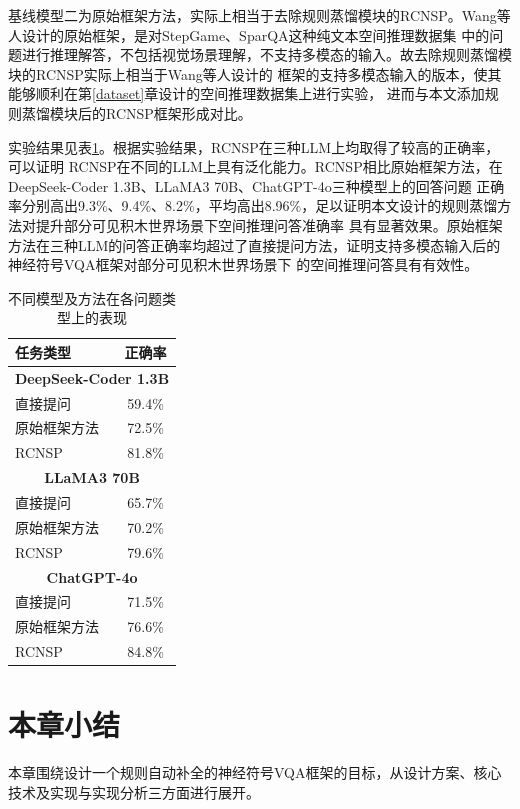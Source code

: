 基线模型二为原始框架方法，实际上相当于去除规则蒸馏模块的RCNSP。Wang等人设计的原始框架，是对StepGame、SparQA这种纯文本空间推理数据集
中的问题进行推理解答，不包括视觉场景理解，不支持多模态的输入。故去除规则蒸馏模块的RCNSP实际上相当于Wang等人设计的
框架的支持多模态输入的版本，使其能够顺利在第\ref{dataset}章设计的空间推理数据集上进行实验，
进而与本文添加规则蒸馏模块后的RCNSP框架形成对比。

实验结果见表\ref{tab:overall_comparison}。根据实验结果，RCNSP在三种LLM上均取得了较高的正确率，可以证明
RCNSP在不同的LLM上具有泛化能力。RCNSP相比原始框架方法，在DeepSeek-Coder 1.3B、LLaMA3 70B、ChatGPT-4o三种模型上的回答问题
正确率分别高出9.3\%、9.4\%、8.2\%，平均高出8.96\%，足以证明本文设计的规则蒸馏方法对提升部分可见积木世界场景下空间推理问答准确率
具有显著效果。原始框架方法在三种LLM的问答正确率均超过了直接提问方法，证明支持多模态输入后的神经符号VQA框架对部分可见积木世界场景下
的空间推理问答具有有效性。
\begin{table}[h]
    \centering
    \begin{tabular}{lc}
        \toprule
        \textbf{任务类型} & \textbf{正确率} \\
        \midrule
        \multicolumn{2}{c}{\textbf{DeepSeek-Coder 1.3B}} \\
        直接提问 & 59.4\% \\
        原始框架方法 & 72.5\% \\
        RCNSP & 81.8\% \\
        \midrule
        \multicolumn{2}{c}{\textbf{LLaMA3 70B}} \\
        直接提问 & 65.7\% \\
        原始框架方法 & 70.2\% \\
        RCNSP & 79.6\% \\
        \midrule
        \multicolumn{2}{c}{\textbf{ChatGPT-4o}} \\
        直接提问 & 71.5\% \\
        原始框架方法 & 76.6\% \\
        RCNSP & 84.8\% \\
        \bottomrule
    \end{tabular}
    \caption{不同模型及方法在各问题类型上的表现}
    \label{tab:overall_comparison}
\end{table}
\section{本章小结}
本章围绕设计一个规则自动补全的神经符号VQA框架的目标，从设计方案、核心技术及实现与实现分析三方面进行展开。

